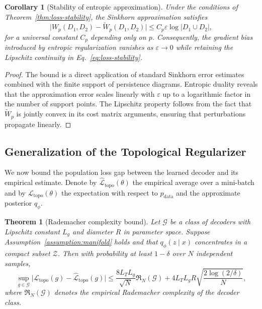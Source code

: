\documentclass[11pt]{article}
\newtheorem{theorem}{Theorem}
\newtheorem{corollary}{Corollary}
\theoremstyle{definition}
\begin{document}
\begin{corollary}[Stability of entropic approximation]
\label{corollary:entropic-stability}
Under the conditions of Theorem~\ref{thm:loss-stability}, the Sinkhorn approximation satisfies
\begin{equation}
    \big| W_p(D_1, D_2) - \widetilde{W}_p(D_1, D_2) \big| \leq C_p \varepsilon \log |D_1 \cup D_2|,
    \label{eq:entropic-gap}
\end{equation}
for a universal constant $C_p$ depending only on $p$. Consequently, the gradient bias introduced by entropic regularization vanishes as $\varepsilon \to 0$ while retaining the Lipschitz continuity in Eq.~\eqref{eq:loss-stability}.
\end{corollary}

\begin{proof}
The bound is a direct application of standard Sinkhorn error estimates \cite{cuturi2013sinkhorn} combined with the finite support of persistence diagrams. Entropic duality reveals that the approximation error scales linearly with $\varepsilon$ up to a logarithmic factor in the number of support points. The Lipschitz property follows from the fact that $\widetilde{W}_p$ is jointly convex in its cost matrix arguments, ensuring that perturbations propagate linearly.
\end{proof}

\subsection{Generalization of the Topological Regularizer}
We now bound the population loss gap between the learned decoder and its empirical estimate. Denote by $\widehat{\mathcal{L}}_{\text{topo}}(\theta)$ the empirical average over a mini-batch and by $\mathcal{L}_{\text{topo}}(\theta)$ the expectation with respect to $p_{\text{data}}$ and the approximate posterior $q_\phi$.

\begin{theorem}[Rademacher complexity bound]
\label{thm:rademacher}
Let $\mathcal{G}$ be a class of decoders with Lipschitz constant $L_g$ and diameter $R$ in parameter space. Suppose Assumption~\ref{assumption:manifold} holds and that $q_\phi(z \mid x)$ concentrates in a compact subset $\mathcal{Z}$. Then with probability at least $1-\delta$ over $N$ independent samples,
\begin{equation}
    \sup_{g \in \mathcal{G}} \big| \mathcal{L}_{\text{topo}}(g) - \widehat{\mathcal{L}}_{\text{topo}}(g) \big| \leq \frac{8 L_T L_g}{\sqrt{N}} \mathfrak{R}_N(\mathcal{G}) + 4 L_T L_g R \sqrt{\frac{2 \log(2/\delta)}{N}},
    \label{eq:generalization}
\end{equation}
where $\mathfrak{R}_N(\mathcal{G})$ denotes the empirical Rademacher complexity of the decoder class.
\end{theorem}
\end{document}
